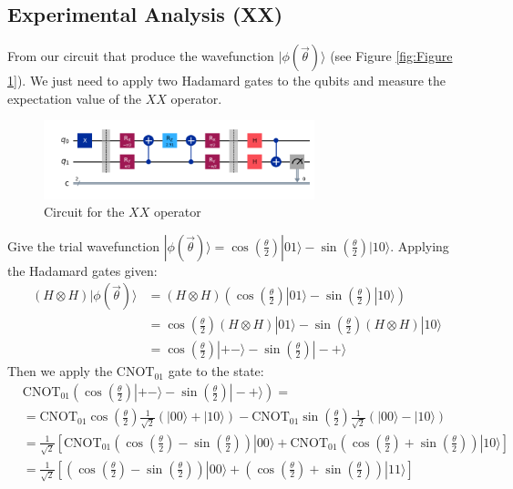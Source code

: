 \documentclass{article}
\begin{document}
\subsection{Experimental Analysis (XX)}
	From our circuit that produce the wavefunction \(|\phi(\vec{\theta})\rangle\) (see Figure \ref{fig:Figure 1}). We just need to apply two Hadamard gates to the qubits and measure the expectation value of the \(XX\) operator.
	\begin{figure}[H]
		\label{fig:Figure XX}
		\centering
		\includegraphics[width=0.7\textwidth, height=0.2\textheight]{XX.png}
		\caption{Circuit for the \(XX\) operator}
	\end{figure}
	Give the trial wavefunction \(|\phi(\vec{\theta})\rangle = \cos\left(\frac{\theta}{2}\right)|01\rangle - \sin\left(\frac{\theta}{2}\right)|10\rangle\). Applying the Hadamard gates given:
	\begin{align*}
		(H \otimes H)|\phi(\vec{\theta})\rangle  &= (H \otimes H)(\cos\left(\frac{\theta}{2}\right)|01\rangle - \sin\left(\frac{\theta}{2}\right)|10\rangle) \\
		                                         &= \cos\left(\frac{\theta}{2}\right)(H \otimes H)|01\rangle - \sin\left(\frac{\theta}{2}\right)(H \otimes H)|10\rangle \\
		                                         &= \cos\left(\frac{\theta}{2}\right)|+-\rangle - \sin\left(\frac{\theta}{2}\right)|-+\rangle
	\end{align*}
	Then we apply the \(\text{CNOT}_{01}\) gate to the state:
	\begin{align*}
		&\text{CNOT}_{01}(\cos\left(\frac{\theta}{2}\right)|+-\rangle - \sin\left(\frac{\theta}{2}\right)|-+\rangle) =\\ 
		&= \text{CNOT}_{01} \cos\left(\frac{\theta}{2}\right)\frac{1}{\sqrt{2}}\left(|00\rangle + |10\rangle\right) - \text{CNOT}_{01}\sin\left(\frac{\theta}{2}\right)\frac{1}{\sqrt{2}}\left(|00\rangle - |10\rangle\right) \\
		&= \frac{1}{\sqrt{2}} \left[\text{CNOT}_{01}\left(\cos\left(\frac{\theta}{2}\right)-\sin\left(\frac{\theta}{2}\right)\right)|00\rangle+\text{CNOT}_{01}\left(\cos\left(\frac{\theta}{2}\right)+\sin\left(\frac{\theta}{2}\right)\right)|10\rangle\right]\\
		&= \frac{1}{\sqrt{2}} \left[\left(\cos\left(\frac{\theta}{2}\right)-\sin\left(\frac{\theta}{2}\right)\right)|00\rangle+\left(\cos\left(\frac{\theta}{2}\right)+\sin\left(\frac{\theta}{2}\right)\right)|11\rangle\right]
	\end{align*}
\end{document}
